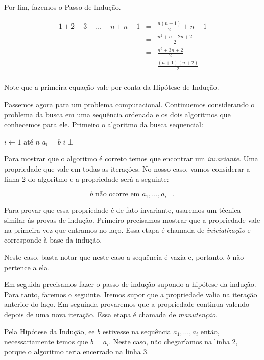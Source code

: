 Por fim, fazemos o Passo de Indução.

\begin{eqnarray*}
  1 + 2 + 3 + \dots + n + n + 1 & = & \frac{n(n+1)}{2} + n + 1 \\
  & = & \frac{n^2 + n + 2n + 2}{2} \\
  & = & \frac{n^2 + 3n + 2}{2} \\
  & = & \frac{(n+1)(n+2)}{2} \\
\end{eqnarray*}

Note que a primeira equação vale por conta da Hipótese de Indução.

Passemos agora para um problema computacional.
Continuemos considerando o problema da busca em uma sequência ordenada e os dois algoritmos que conhecemos para ele.
Primeiro o algoritmo da busca sequencial:

\begin{codebox}
\li \For $i \gets 1$ até $n$
\li \Do \If $a_i = b$
\li     \Then \Return $i$
        \End
    \End
\li \Return $\bot$
\End
\end{codebox}

Para mostrar que o algoritmo é correto temos que encontrar um {\em invariante}.
Uma propriedade que vale em todas as iterações.
No nosso caso, vamos considerar a linha 2 do algoritmo e a propriedade será a seguinte:

\begin{displaymath}
b \textrm{ não ocorre em } a_1, \dots, a_{i-1}
\end{displaymath}


Para provar que essa propriedade é de fato invariante, usaremos um técnica similar às provas de indução.
Primeiro precisamos mostrar que a propriedade vale na primeira vez que entramos no laço.
Essa etapa é chamada de {\em inicialização} e corresponde à base da indução.

Neste caso, basta notar que neste caso a sequência é vazia e, portanto, $b$ não pertence a ela.

Em seguida precisamos fazer o passo de indução supondo a hipótese da indução.
Para tanto, faremos o seguinte.
Iremos supor que a propriedade valia na iteração anterior do laço.
Em seguinda provaremos que a propriedade continua valendo depois de uma nova iteração.
Essa etapa é chamada de {\em manutenção}.


Pela Hipótese da Indução, ee $b$ estivesse na sequência $a_1, \dots, a_i$ então, necessariamente temos que $b = a_i$.
Neste caso, não chegaríamos na linha 2, porque o algoritmo teria encerrado na linha 3.

